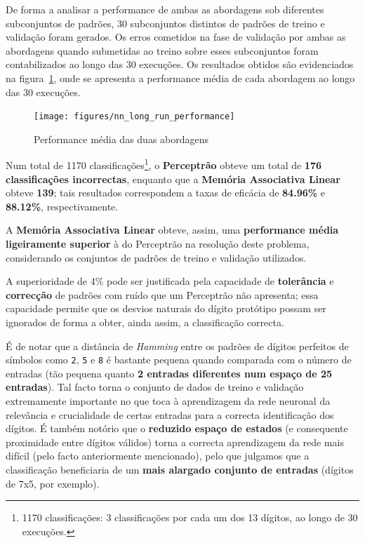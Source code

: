 \documentclass{article}
\begin{document}
De forma a analisar a performance de ambas as abordagens sob diferentes subconjuntos de padrões, 30 subconjuntos distintos de padrões de treino e validação foram gerados. Os erros cometidos na fase de validação por ambas as abordagens quando submetidas ao treino sobre esses subconjuntos foram contabilizados ao longo das 30 execuções. Os resultados obtidos são evidenciados na figura~\ref{nn_long_run_performance}, onde se apresenta a performance média de cada abordagem ao longo das 30 execuções.

\begin{figure}[!h]
  \centering
  \texttt{[image: figures/nn\_long\_run\_performance]}
  \caption{Performance média das duas abordagens}
  \label{nn_long_run_performance}
\end{figure}

Num total de 1170 classificações\footnote{1170 classificações: 3 classificações por cada um dos 13 dígitos, ao longo de 30 execuções.}, o \textbf{Perceptrão} obteve um total de \textbf{176 classificações incorrectas}, enquanto que a \textbf{Memória Associativa Linear} obteve \textbf{139}; tais resultados correspondem a taxas de eficácia de \textbf{84.96\%} e \textbf{88.12\%}, respectivamente.

A \textbf{Memória Associativa Linear} obteve, assim, uma \textbf{performance média ligeiramente superior} à do Perceptrão na resolução deste problema, considerando os conjuntos de padrões de treino e validação utilizados.

A superioridade de 4\% pode ser justificada pela capacidade de \textbf{tolerância} e \textbf{correcção} de padrões com ruído que um Perceptrão não apresenta; essa capacidade permite que os desvios naturais do dígito protótipo possam ser ignorados de forma a obter, ainda assim, a classificação correcta.

É de notar que a distância de \textit{Hamming} entre os padrões de dígitos perfeitos de símbolos como \texttt{2}, \texttt{5} e \texttt{8} é bastante pequena quando comparada com o número de entradas (tão pequena quanto \textbf{2 entradas diferentes num espaço de 25 entradas}). Tal facto torna o conjunto de dados de treino e validação extremamente importante no que toca à aprendizagem da rede neuronal da relevância e crucialidade de certas entradas para a correcta identificação dos dígitos. É também notório que o \textbf{reduzido espaço de estados} (e consequente proximidade entre dígitos válidos) torna a correcta aprendizagem da rede mais difícil (pelo facto anteriormente mencionado), pelo que julgamos que a classificação beneficiaria de um \textbf{mais alargado conjunto de entradas} (dígitos de 7x5, por exemplo).
\end{document}
